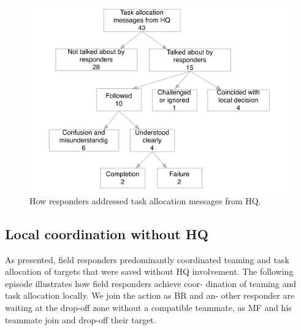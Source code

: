 \begin{figure}[h]
  \centering
  \includegraphics[width=1\textwidth]{img/study1/instructions}
  \caption{How responders addressed task allocation messages from HQ.}
  \label{fig:intructions}
\end{figure}

\subsection{Local coordination without HQ}
As presented, field responders predominantly coordinated teaming and task allocation of targets that were saved without HQ involvement. The following episode illustrates how field responders achieve coor- dination of teaming and task allocation locally. We join the action as BR and an- other responder are waiting at the drop-off zone without a compatible teammate, as MF and his teammate join and drop-off their target.\\

